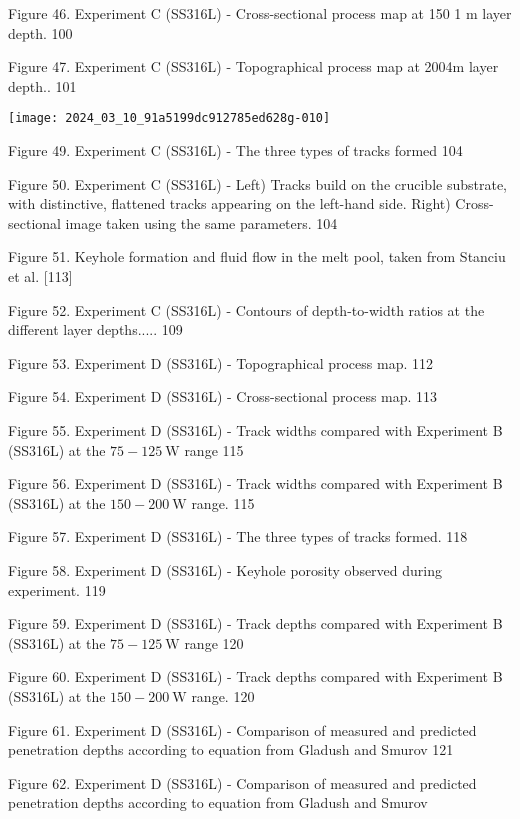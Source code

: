\documentclass[10pt]{article}
\begin{document}
Figure 46. Experiment C (SS316L) - Cross-sectional process map at 150 1 m layer depth. 100

Figure 47. Experiment C (SS316L) - Topographical process map at 2004m layer depth.. 101

\begin{center}
\texttt{[image: 2024\_03\_10\_91a5199dc912785ed628g-010]}
\end{center}

Figure 49. Experiment C (SS316L) - The three types of tracks formed 104

Figure 50. Experiment C (SS316L) - Left) Tracks build on the crucible substrate, with distinctive, flattened tracks appearing on the left-hand side. Right) Cross-sectional image taken using the same parameters. 104

Figure 51. Keyhole formation and fluid flow in the melt pool, taken from Stanciu et al. [113]

Figure 52. Experiment C (SS316L) - Contours of depth-to-width ratios at the different layer depths..... 109

Figure 53. Experiment D (SS316L) - Topographical process map. 112

Figure 54. Experiment D (SS316L) - Cross-sectional process map. 113

Figure 55. Experiment D (SS316L) - Track widths compared with Experiment B (SS316L) at the $75-125 \mathrm{~W}$ range 115

Figure 56. Experiment D (SS316L) - Track widths compared with Experiment B (SS316L) at the $150-200 \mathrm{~W}$ range. 115

Figure 57. Experiment D (SS316L) - The three types of tracks formed. 118

Figure 58. Experiment D (SS316L) - Keyhole porosity observed during experiment. 119

Figure 59. Experiment D (SS316L) - Track depths compared with Experiment B (SS316L) at the $75-125 \mathrm{~W}$ range 120

Figure 60. Experiment D (SS316L) - Track depths compared with Experiment B (SS316L) at the $150-200 \mathrm{~W}$ range. 120

Figure 61. Experiment D (SS316L) - Comparison of measured and predicted penetration depths according to equation from Gladush and Smurov 121

Figure 62. Experiment D (SS316L) - Comparison of measured and predicted penetration depths according to equation from Gladush and Smurov
\end{document}
